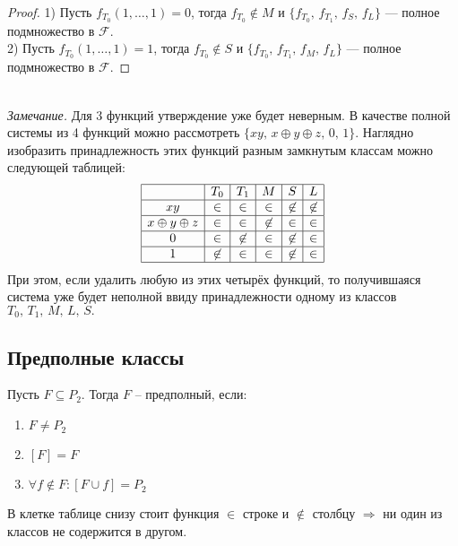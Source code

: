 \begin{proof}
1) Пусть $f_{T_0}(1,\ldots,1) = 0$, тогда $f_{T_0} \not \in M$ и $\{f_{T_0},\, f_{T_1},\, f_S,\,f_L \}$ --- полное подмножество в $\mathcal{F}$.\\
2) Пусть $f_{T_0}(1,\ldots,1) = 1$, тогда $f_{T_0} \not \in S$ и $\{f_{T_0},\, f_{T_1},\, f_M,\,f_L \}$ --- полное подмножество в $\mathcal{F}$.
\end{proof}
~\\
\textit{Замечание.} Для 3 функций утверждение уже будет неверным. В качестве полной системы из 4 функций можно рассмотреть  $\{xy,\, x\oplus y\oplus z, \, 0,\, 1 \}$. Наглядно изобразить принадлежность этих функций разным замкнутым классам можно следующей таблицей:
$$
\begin{array}{|c|c|c|c|c|c|}
\hline
    &      T_0       &       T_1      &      M      &      S      &      L \\
\hline
xy  &      \in       &       \in      &      \in    &   \not\in   &    \not\in \\
\hline 
x\oplus y\oplus z & \in &    \in      &     \not\in &   \in       &    \in \\
\hline
0   &      \in       &     \not\in    &      \in    &   \not\in   &    \in \\
\hline
1   &      \not\in   &     \in        &      \in    &   \not\in   &    \in \\
\hline
\end{array}
$$
При этом, если удалить любую из этих четырёх функций, то получившаяся система уже будет неполной ввиду принадлежности одному из классов $ T_0,\, T_1,\,M,\,L,\,S.$

\subsection{Предполные классы}

\begin{definition}
	Пусть $F \subseteq P_2$. Тогда $F$ -- предполный, если: 
	\begin{enumerate}
		\item $F \ne P_2$
		\item $[F] = F$
		\item $\forall f \notin F: [F \cup {f}] = P_2$
	\end{enumerate}
\end{definition}

В клетке таблице снизу стоит функция $\in$ строке и $\not \in $ столбцу $\Rightarrow$ ни один из классов не содержится в другом.

